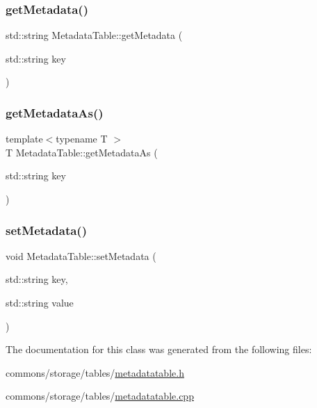 \mbox{\label{class_metadata_table_a0e12977afc5cadd6932171d90f4eade0}} 
\subsubsection{\texorpdfstring{getMetadata()}{getMetadata()}}
{\footnotesize\ttfamily std\+::string Metadata\+Table\+::get\+Metadata (\begin{DoxyParamCaption}\item[{std\+::string}]{key }\end{DoxyParamCaption})}

\mbox{\label{class_metadata_table_a8445f210337a939e61d732babc0672ef}} 
\subsubsection{\texorpdfstring{getMetadataAs()}{getMetadataAs()}}
{\footnotesize\ttfamily template$<$typename T $>$ \\
T Metadata\+Table\+::get\+Metadata\+As (\begin{DoxyParamCaption}\item[{std\+::string}]{key }\end{DoxyParamCaption})\hspace{0.3cm}{\ttfamily [inline]}}

\mbox{\label{class_metadata_table_a0d6511046cf483b2cf951576dc5ce773}} 
\subsubsection{\texorpdfstring{setMetadata()}{setMetadata()}}
{\footnotesize\ttfamily void Metadata\+Table\+::set\+Metadata (\begin{DoxyParamCaption}\item[{std\+::string}]{key,  }\item[{std\+::string}]{value }\end{DoxyParamCaption})}



The documentation for this class was generated from the following files\+:\begin{DoxyCompactItemize}
\item 
commons/storage/tables/\mbox{\hyperlink{metadatatable_8h}{metadatatable.\+h}}\item 
commons/storage/tables/\mbox{\hyperlink{metadatatable_8cpp}{metadatatable.\+cpp}}\end{DoxyCompactItemize}

